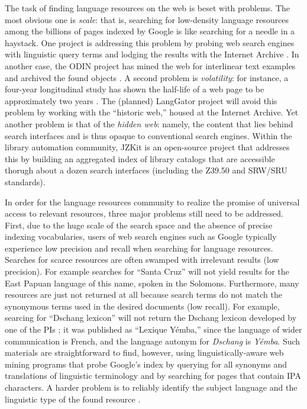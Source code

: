 The task of finding language resources on the web is beset with
problems.  The most obvious one is \emph{scale}: that is, searching for
low-density language resources among the billions of pages indexed
by Google is like searching for a needle in a haystack.  One project is
addressing this problem by probing web search engines with linguistic
query terms and lodging the results with the Internet Archive
\citep{BaldwinBird06}. In another case, the ODIN project has mined
the web for interlinear text examples and archived the found objects
\citep{Langendoen02,Lewis03}.  A second problem is \emph{volatility}:
for instance, a four-year longitudinal study has shown the half-life
of a web page to be approximately two years \cite{Koehler02}.
The (planned) LangGator project will avoid this problem by working
with the ``historic web,'' housed at the Internet Archive.  Yet
another problem is that of the
\emph{hidden web}: namely, the content that lies behind search
interfaces and is thus opaque to conventional search engines.
Within the library automation community, JZKit is an open-source project
that addresses this by building an aggregated index of library
catalogs that are accessible thorugh about a dozen search interfaces
(including the Z39.50 and SRW/SRU standards).


In order for the language resources community to realize the promise of universal access to relevant resources, three major
problems still need to be addressed.
First, due to the huge scale of the search space and the absence
of precise indexing vocabularies,
users of web search engines such as Google typically experience
low precision and recall when searching for language resources.
Searches for scarce resources are often swamped with irrelevant
results (low precision).  For example searches for ``Santa Cruz'' will
not yield results for the East Papuan language of this name, spoken in
the Solomons.
Furthermore, many resources are just not returned at all because
search terms do not match the synonymous terms used in the desired
documents (low recall).  For example, searcing for ``Dschang lexicon''
will not return the Dschang lexicon developed by one of the PIs
\citep{BirdTadadjeu97}; it was published as ``Lexique Y\'emba,'' since
the language of wider communication is French, and the language
autonym for \textit{Dschang} is \textit{Y\'emba}.
Such materials are straightforward to find, however, using
linguistically-aware web mining programs that probe
Google's index by querying for all synonyms and translations of
linguistic terminology and by searching for pages that contain IPA characters.
A harder problem is to reliably identify the subject language and the
linguistic type of the found resource \citep{HughesBaldwin06lrec}.

